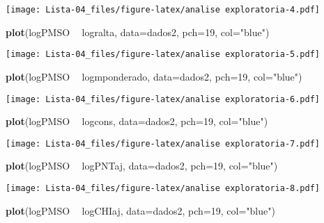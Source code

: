 \documentclass[
]{article}
\newenvironment{Shaded}{\begin{snugshade}}{\end{snugshade}}
\newcommand{\DataTypeTok}[1]{\textcolor[rgb]{0.13,0.29,0.53}{#1}}
\newcommand{\DecValTok}[1]{\textcolor[rgb]{0.00,0.00,0.81}{#1}}
\newcommand{\KeywordTok}[1]{\textcolor[rgb]{0.13,0.29,0.53}{\textbf{#1}}}
\newcommand{\NormalTok}[1]{#1}
\newcommand{\OperatorTok}[1]{\textcolor[rgb]{0.81,0.36,0.00}{\textbf{#1}}}
\newcommand{\StringTok}[1]{\textcolor[rgb]{0.31,0.60,0.02}{#1}}
\begin{document}
\texttt{[image: Lista-04\_files/figure-latex/analise exploratoria-4.pdf]}

\begin{Shaded}
\begin{Highlighting}[]
\KeywordTok{plot}\NormalTok{(logPMSO }\OperatorTok{~}\StringTok{ }\NormalTok{logralta, }\DataTypeTok{data=}\NormalTok{dados2, }\DataTypeTok{pch=}\DecValTok{19}\NormalTok{, }\DataTypeTok{col=}\StringTok{"blue"}\NormalTok{)}
\end{Highlighting}
\end{Shaded}

\texttt{[image: Lista-04\_files/figure-latex/analise exploratoria-5.pdf]}

\begin{Shaded}
\begin{Highlighting}[]
\KeywordTok{plot}\NormalTok{(logPMSO }\OperatorTok{~}\StringTok{ }\NormalTok{logmponderado, }\DataTypeTok{data=}\NormalTok{dados2, }\DataTypeTok{pch=}\DecValTok{19}\NormalTok{, }\DataTypeTok{col=}\StringTok{"blue"}\NormalTok{)}
\end{Highlighting}
\end{Shaded}

\texttt{[image: Lista-04\_files/figure-latex/analise exploratoria-6.pdf]}

\begin{Shaded}
\begin{Highlighting}[]
\KeywordTok{plot}\NormalTok{(logPMSO }\OperatorTok{~}\StringTok{ }\NormalTok{logcons, }\DataTypeTok{data=}\NormalTok{dados2, }\DataTypeTok{pch=}\DecValTok{19}\NormalTok{, }\DataTypeTok{col=}\StringTok{"blue"}\NormalTok{)}
\end{Highlighting}
\end{Shaded}

\texttt{[image: Lista-04\_files/figure-latex/analise exploratoria-7.pdf]}

\begin{Shaded}
\begin{Highlighting}[]
\KeywordTok{plot}\NormalTok{(logPMSO }\OperatorTok{~}\StringTok{ }\NormalTok{logPNTaj, }\DataTypeTok{data=}\NormalTok{dados2, }\DataTypeTok{pch=}\DecValTok{19}\NormalTok{, }\DataTypeTok{col=}\StringTok{"blue"}\NormalTok{)}
\end{Highlighting}
\end{Shaded}

\texttt{[image: Lista-04\_files/figure-latex/analise exploratoria-8.pdf]}

\begin{Shaded}
\begin{Highlighting}[]
\KeywordTok{plot}\NormalTok{(logPMSO }\OperatorTok{~}\StringTok{ }\NormalTok{logCHIaj, }\DataTypeTok{data=}\NormalTok{dados2, }\DataTypeTok{pch=}\DecValTok{19}\NormalTok{, }\DataTypeTok{col=}\StringTok{"blue"}\NormalTok{)}
\end{Highlighting}
\end{Shaded}
\end{document}
